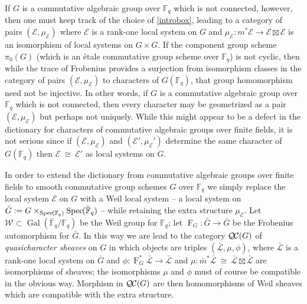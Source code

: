 \documentclass{amsart}
\theoremstyle{plain}
\theoremstyle{definition}
\theoremstyle{remark}
\newcommand{\FF}{{\mathbb{F}}}
\newcommand{\Weil}[1]{\mathcal{W}_{#1}}
\DeclareMathOperator{\Gal}{Gal}
\newcommand{\Frob}[1]{\operatorname{F}_{#1}}
\newcommand{\Spec}[1]{{\operatorname{Spec}\hskip-1pt( #1 )}}
\newcommand{\iso}{{\ \cong\ }}
\newcommand{\qcs}[1]{{\mathcal{#1}}}
\newcommand{\gqcs}[1]{{\mathcal{\bar #1}}}
\newcommand{\QC}{{\mathcal{Q\hskip-0.8pt C}}}
\newcommand{\bG}{\bar{G}}
\begin{document}
If $G$ is a commutative algebraic group over $\FF_q$ which is not connected, however, then one must keep track of the choice of \eqref{introbox}, leading to a category of pairs $(\qcs{E},\mu_\qcs{E})$ where $\qcs{E}$ is a rank-one local system on $G$ and $\mu_\qcs{E} : m^*\qcs{E} \to \qcs{E}\boxtimes\qcs{E}$ is an isomorphism of local systems on $G\times G$. 
If the component group scheme $\pi_0(G)$ (which is an étale commutative group scheme over $\FF_q$) is not cyclic, then while the trace of Frobenius provides a surjection from isomorphism classes in the category of pairs $(\qcs{E},\mu_\qcs{E})$ to characters of $G(\FF_q)$, that group homomorphism need not be injective. 
In other words, if $G$ is a commutative algebraic group over $\FF_q$ which is not connected, then every character may be geometrized as a pair $(\qcs{E},\mu_\qcs{E})$ but perhaps not uniquely. 
While this might appear to be a defect in the dictionary for characters of commutative algebraic groups over finite fields, it is not serious since if $(\qcs{E},\mu_\qcs{E})$ and $(\qcs{E}',\mu_\qcs{E}')$ determine the same character of $G(\FF_q)$ then $\qcs{E}\iso \qcs{E}'$ as local systems on $G$.

In order to extend the dictionary from commutative algebraic groups over finite fields to smooth commutative group schemes $G$ over $\FF_q$ we simply replace the local system $\qcs{E}$ on $G$ with a Weil local system  -- a local system on ${\bar G} := G\times_{\Spec{\FF_q}} \Spec{{\bar \FF}_q}$ -- while retaining the extra structure $\mu_\qcs{E}$. 
Let $\Weil{} \subset \Gal({\bar\FF}_q/\FF_q)$ be the Weil group for $\FF_q$; let $\Frob{G} : \bG \to \bG$ be the Frobenius automorphism for $\bG$.
In this way we are lead to the category $\QC(G)$ of {\it quasicharacter sheaves} on $G$ in which objects are triples $(\gqcs{L}, \mu,\phi)$, where $\gqcs{L}$ is a rank-one local system on ${\bar G}$ and $\phi : \Frob{G}^* \gqcs{L}\to \gqcs{L}$ and $\mu : {\bar m}^* \gqcs{L} \iso \gqcs{L} \boxtimes \gqcs{L}$ are isomorphisms of sheaves; the isomorphisms $\mu$ and $\phi$ must of course be compatible in the obvious way. Morphism in $\QC(G)$ are then homomorphisms of Weil sheaves which are compatible with the extra structure.
\end{document}
